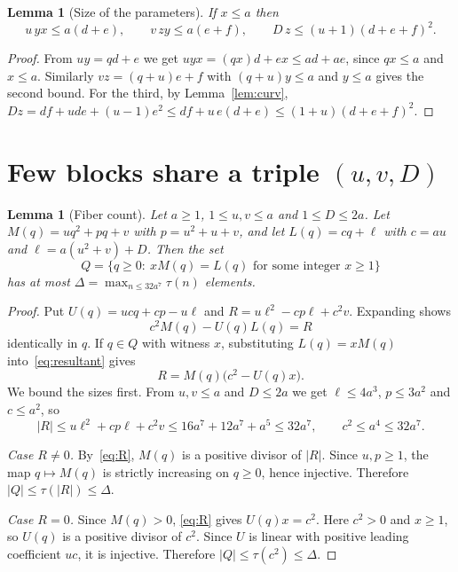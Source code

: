 \documentclass[11pt]{amsart}
\newtheorem{lemma}[theorem]{Lemma}
\theoremstyle{definition}
\theoremstyle{remark}
\begin{document}
\begin{lemma}[Size of the parameters]\label{lem:size}
If $x\le a$ then
\[
u\,yx\le a(d+e),\qquad v\,zy\le a(e+f),\qquad D\,z\le (u+1)(d+e+f)^2 .
\]
\end{lemma}

\begin{proof}
From $uy=qd+e$ we get $uyx=(qx)d+ex\le ad+ae$, since $qx\le a$ and $x\le a$. Similarly
$vz=(q+u)e+f$ with $(q+u)y\le a$ and $y\le a$ gives the second bound. For the third, by
Lemma~\ref{lem:curv},
$Dz=df+ude+(u-1)e^2\le df+u\,e(d+e)\le (1+u)(d+e+f)^2$.
\end{proof}

\section{Few blocks share a triple \texorpdfstring{$(u,v,D)$}{(u,v,D)}}

\begin{lemma}[Fiber count]\label{lem:fiber}
Let $a\ge1$, $1\le u,v\le a$ and $1\le D\le 2a$. Let $M(q)=uq^2+pq+v$ with $p=u^2+u+v$, and
let $L(q)=cq+\ell$ with $c=au$ and $\ell=a(u^2+v)+D$. Then the set
\[
Q=\{q\ge 0:\ xM(q)=L(q)\text{ for some integer }x\ge1\}
\]
has at most $\Delta=\max_{n\le 32a^7}\tau(n)$ elements.
\end{lemma}

\begin{proof}
Put $U(q)=ucq+cp-u\ell$ and $R=u\ell^2-cp\ell+c^2v$. Expanding shows
\begin{equation}\label{eq:resultant}
c^2M(q)-U(q)L(q)=R
\end{equation}
identically in $q$. If $q\in Q$ with witness $x$, substituting $L(q)=xM(q)$
into~\eqref{eq:resultant} gives
\begin{equation}\label{eq:R}
R=M(q)\bigl(c^2-U(q)x\bigr).
\end{equation}
We bound the sizes first. From $u,v\le a$ and $D\le 2a$ we get $\ell\le 4a^3$, $p\le 3a^2$
and $c\le a^2$, so
\[
|R|\le u\ell^2+cp\ell+c^2v\le 16a^7+12a^7+a^5\le 32a^7,\qquad c^2\le a^4\le 32a^7 .
\]

\emph{Case $R\ne0$.} By~\eqref{eq:R}, $M(q)$ is a positive divisor of $|R|$. Since $u,p\ge1$,
the map $q\mapsto M(q)$ is strictly increasing on $q\ge0$, hence injective. Therefore
$|Q|\le\tau(|R|)\le\Delta$.

\emph{Case $R=0$.} Since $M(q)>0$, \eqref{eq:R} gives $U(q)x=c^2$. Here $c^2>0$ and $x\ge1$,
so $U(q)$ is a positive divisor of $c^2$. Since $U$ is linear with positive leading
coefficient $uc$, it is injective. Therefore $|Q|\le\tau(c^2)\le\Delta$.
\end{proof}
\end{document}

